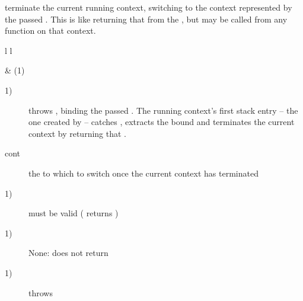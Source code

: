 
terminate the current running context, switching to the context represented by
the passed \cont. This is like returning that \cont from the \entryfn, but may
be called from any function on that context.

\begin{tabular}{ l l }
    \midrule

     & (1)\\

    \midrule
\end{tabular}

\begin{description}
    \item[1)] throws \unwindex, binding the passed \cont. The running
              context's first stack entry -- the one created by \callcc --
              catches \unwindex, extracts the bound \cont and terminates the
              current context by returning that \cont.
\end{description}

\begin{description}
    \item[cont] the \cont to which to switch once the current context has terminated
\end{description}

\begin{description}
    \item[1)]  must be valid ( returns )
\end{description}

\begin{description}
    \item[1)] None: \termthen does not return
\end{description}

\begin{description}
    \item[1)] throws \unwindex
\end{description}
